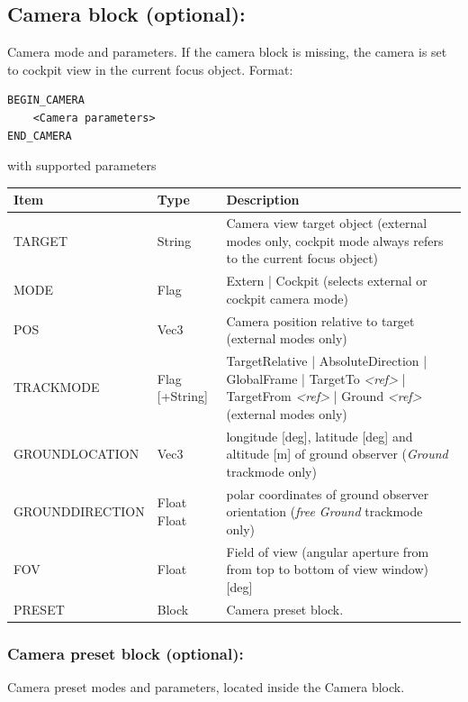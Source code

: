 \documentclass[Orbiter Developer Manual.tex]{subfiles}
\begin{document}
\subsection*{Camera block (optional):}

Camera mode and parameters. If the camera block is missing, the camera is set to cockpit view in the current focus object. Format:

\begin{lstlisting}[language=OSFS]
BEGIN_CAMERA
	<Camera parameters>
END_CAMERA
\end{lstlisting}

\noindent
with supported parameters

\begin{table}[H]
	\centering
	\begin{tabularx}{\textwidth}{ |l|l|X| }
	\hline\rule{0pt}{2ex}
	\textbf{Item} & \textbf{Type} & \textbf{Description}\\
	\hline\rule{0pt}{2ex}
	TARGET & String & Camera view target object (external modes only, cockpit mode always refers to the current focus object)\\
	\hline\rule{0pt}{2ex}
	MODE & Flag & Extern | Cockpit (selects external or cockpit camera mode)\\
	\hline\rule{0pt}{2ex}
	POS & Vec3 & Camera position relative to target (external modes only)\\
	\hline\rule{0pt}{2ex}
	TRACKMODE & Flag [+String] & TargetRelative | AbsoluteDirection | GlobalFrame | TargetTo \textit{<ref>} | TargetFrom \textit{<ref>} | Ground \textit{<ref>} (external modes only)\\
	\hline\rule{0pt}{2ex}
	GROUNDLOCATION & Vec3 & longitude [deg], latitude [deg] and altitude [m] of ground observer (\textit{Ground} trackmode only)\\
	\hline\rule{0pt}{2ex}
	GROUNDDIRECTION & Float Float & polar coordinates of ground observer orientation (\textit{free Ground} trackmode only)\\
	\hline\rule{0pt}{2ex}
	FOV & Float & Field of view (angular aperture from from top to bottom of view window) [deg]\\
	\hline\rule{0pt}{2ex}
	PRESET & Block & Camera preset block.\\
	\hline
	\end{tabularx}
\end{table}


\subsubsection*{Camera preset block (optional):}
Camera preset modes and parameters, located inside the Camera block.
\end{document}
